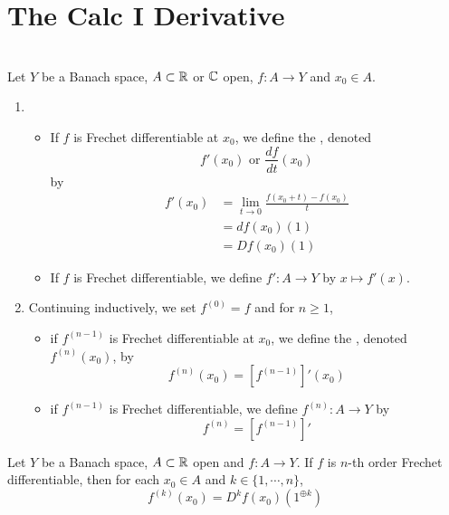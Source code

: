 \documentclass{book}
\begin{document}
	\section{The Calc I Derivative}
	\begin{defn} \ld{}\\
	Let $Y$ be a Banach space, $A \subset \mathbb{R}$ or $\mathbb{C}$ open, $f:A \rightarrow Y$ and $x_0 \in A$. 
	\begin{enumerate}
	\item 
	\begin{itemize}
	\item If $f$ is Frechet differentiable at $x_0$, we define the , denoted $$f'(x_0) \text{ or } \frac{df}{dt}(x_0)$$ by
	\begin{align*}
	f'(x_0) 
	&= \lim_{t \rightarrow 0} \frac{f(x_0 + t) - f(x_0)}{t} \\
	&= df(x_0)(1) \\
	&= Df(x_0)(1)
	\end{align*}
	\item If $f$ is Frechet differentiable, we define $f':A \rightarrow Y$ by $x \mapsto f'(x)$. 
	\end{itemize}
	\item Continuing inductively, we set $f^{(0)} = f$ and for $n \geq 1$,
	\begin{itemize}
	\item  if $f^{(n-1)}$ is Frechet differentiable at $x_0$, we define the , denoted $f^{(n)}(x_0)$, by $$f^{(n)}(x_0) = [f^{(n-1)}]'(x_0)$$ 
	\item if $f^{(n-1)}$ is Frechet differentiable, we define $f^{(n)}:A \rightarrow Y$ by $$f^{(n)} = [f^{(n - 1)}]'$$ 
	\end{itemize}
	\end{enumerate}
	\end{defn}	
	
	\begin{ex} \lex{}
	Let $Y$ be a Banach space, $A \subset \mathbb{R}$ open and $f:A \rightarrow Y$. If $f$ is $n$-th order Frechet differentiable, then for each $x_0 \in A$ and $k \in \{1, \cdots, n\}$, $$f^{(k)}(x_0) = D^kf(x_0)(1^{\oplus k})$$
	\end{ex}
	
\end{document}
